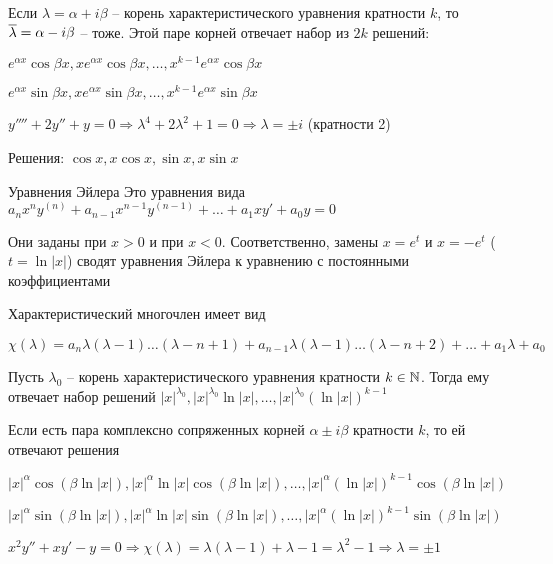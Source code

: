 \documentclass[12pt]{article}
\begin{document}
\begin{Remark}{}
    Если $\lambda = \alpha + i\beta$ -- корень характеристического уравнения кратности $k$, то $\overline{\lambda} = \alpha - i\beta$ -- тоже. Этой паре корней отвечает набор из $2k$ решений:

    $e^{\alpha x}\cos \beta x, xe^{\alpha x}\cos \beta x, \ldots, x^{k - 1}e^{\alpha x}\cos \beta x$

    $e^{\alpha x}\sin \beta x, xe^{\alpha x}\sin \beta x, \ldots, x^{k - 1}e^{\alpha x}\sin \beta x$
\end{Remark}

\begin{Example}{}
    $y'''' + 2y'' + y = 0 \Rightarrow \lambda^4 + 2\lambda^2 + 1 = 0 \Rightarrow \lambda = \pm i$ (кратности 2)

    Решения: $\cos x, x\cos x, \sin x, x\sin x$
\end{Example}

\begin{defin}{Уравнения Эйлера}
    Это уравнения вида $a_nx^ny^{(n)} + a_{n - 1}x^{n - 1}y^{(n - 1)} + \ldots + a_1xy' + a_0y = 0$

    Они заданы при $x > 0$ и при $x < 0$. Соответственно, замены $x = e^t$ и $x = -e^t$ ($t = \ln|x|$) сводят уравнения Эйлера к уравнению с постоянными коэффициентами 

    Характеристический многочлен имеет вид 
    
    $\chi(\lambda) = a_n\lambda(\lambda - 1)\ldots(\lambda - n + 1) + a_{n - 1}\lambda(\lambda - 1)\ldots(\lambda - n + 2) + \ldots + a_1\lambda + a_0$
\end{defin}

\begin{lem}{}
    Пусть $\lambda_0$ -- корень характеристического уравнения кратности $k \in \mathbb N$. Тогда ему отвечает набор решений $|x|^{\lambda_0}, |x|^{\lambda_0}\ln|x|, \ldots, |x|^{\lambda_0}(\ln|x|)^{k - 1}$

    Если есть пара комплексно сопряженных корней $\alpha \pm i\beta$ кратности $k$, то ей отвечают решения 

    $|x|^{\alpha}\cos(\beta \ln|x|), |x|^{\alpha}\ln|x|\cos(\beta \ln|x|), \ldots, |x|^{\alpha}(\ln|x|)^{k - 1}\cos(\beta \ln|x|)$

    $|x|^{\alpha}\sin(\beta \ln|x|), |x|^{\alpha}\ln|x|\sin(\beta \ln|x|), \ldots, |x|^{\alpha}(\ln|x|)^{k - 1}\sin(\beta \ln|x|)$
\end{lem}

\begin{Example}{}
    $x^2y'' + xy' - y = 0 \Rightarrow \chi(\lambda) = \lambda(\lambda - 1) + \lambda - 1 = \lambda^2 - 1 \Rightarrow \lambda = \pm 1$
\end{Example}
\end{document}
